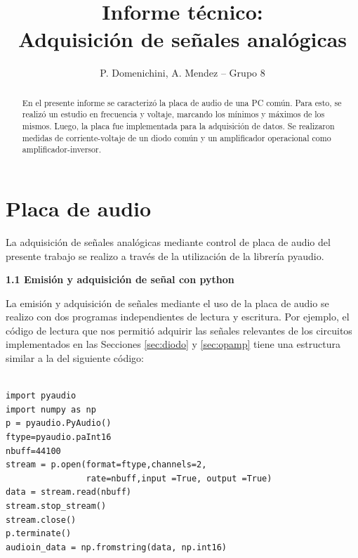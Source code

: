 \documentclass[a4paper,10pt]{article}
\title{Informe técnico: \\
Adquisición de señales analógicas}
\author{P. Domenichini, A. Mendez -- Grupo 8}
\begin{document}
\maketitle

\begin{abstract}
    En el presente informe se caracterizó la placa de audio de una PC común. Para esto, se realizó un estudio en frecuencia y voltaje, marcando los mínimos y máximos de los mismos. Luego, la placa fue implementada para la adquisición de datos. Se realizaron medidas de corriente-voltaje de un diodo común y un amplificador operacional como amplificador-inversor.
\end{abstract}

\section{Placa de audio}
La adquisición de señales analógicas mediante control de placa de audio del presente trabajo se realizo a través de la utilización de la librería {\sc pyaudio}.

\vspace{0.5cm} \noindent
\textbf{\large 1.1 Emisión y adquisición de señal con python} \vspace{0.25cm}

La emisión y adquisición de señales mediante el uso de la placa de audio se realizo con dos programas independientes de lectura y escritura. Por ejemplo, el código de lectura que nos permitió adquirir las señales relevantes de los circuitos implementados en las Secciones \ref{sec:diodo} y \ref{sec:opamp} tiene una estructura similar a la del siguiente código:

\lstset{language=Python}
\begin{lstlisting}[frame=single]  % Start your code-block

import pyaudio
import numpy as np
p = pyaudio.PyAudio()
ftype=pyaudio.paInt16
nbuff=44100
stream = p.open(format=ftype,channels=2,
                rate=nbuff,input =True, output =True)
data = stream.read(nbuff)
stream.stop_stream()
stream.close()
p.terminate()
audioin_data = np.fromstring(data, np.int16)
\end{lstlisting}
\end{document}
